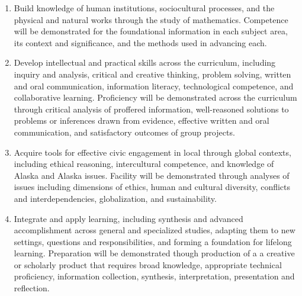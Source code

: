 \documentclass[12pt]{article}
\begin{document}
\begin{enumerate}
\item Build knowledge of human institutions, sociocultural processes, and the physical and natural works through the study of mathematics.  Competence will be demonstrated for the foundational information in each subject area, its context and significance, and the methods used in advancing each.

\item Develop intellectual and practical skills across the curriculum, including inquiry and analysis, critical and creative thinking, problem solving, written and oral communication, information literacy, technological competence, and collaborative learning. Proficiency will be demonstrated across the curriculum through critical analysis of proffered information, well-reasoned solutions to problems or inferences drawn from evidence, effective written and oral communication, and satisfactory outcomes of group projects.

\item Acquire tools for effective civic engagement in local through global contexts, including ethical reasoning, intercultural competence, and knowledge of Alaska and Alaska issues.  Facility will be demonstrated through analyses of issues including dimensions of ethics, human and cultural diversity, conflicts and interdependencies, globalization, and sustainability.   

\item Integrate and apply learning, including synthesis and advanced accomplishment across general and specialized studies, adapting them to new settings, questions and responsibilities, and forming a foundation for lifelong learning. Preparation will be demonstrated though production of a a creative or scholarly product that requires broad knowledge, appropriate technical proficiency, information collection, synthesis, interpretation, presentation and reflection.
\end{enumerate}
\end{document}
